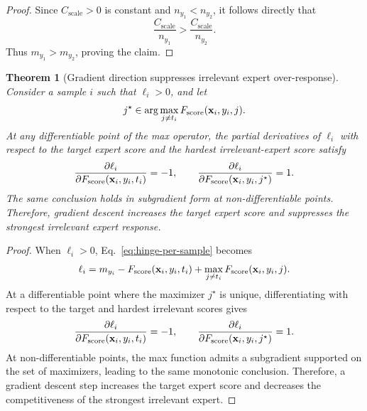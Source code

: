 \documentclass[journal]{IEEEtran}
\theoremstyle{plain}
\newtheorem{theorem}{Theorem}[section]
\theoremstyle{definition}
\theoremstyle{remark}
\begin{document}
\begin{proof}
Since $C_{\mathrm{scale}}>0$ is constant and $n_{y_1}<n_{y_2}$, it follows directly that
\begin{equation}
\frac{C_{\mathrm{scale}}}{n_{y_1}}>\frac{C_{\mathrm{scale}}}{n_{y_2}}.
\end{equation}
Thus $m_{y_1}>m_{y_2}$, proving the claim.
\end{proof}

\begin{theorem}[Gradient direction suppresses irrelevant expert over-response]
\label{thm:gradient-direction}
Consider a sample $i$ such that $\ell_i>0$, and let
\begin{equation}
j^\star\in\arg\max_{j\neq t_i}F_{\mathrm{score}}({\bf x}_i,y_i,j).
\end{equation}
At any differentiable point of the max operator, the partial derivatives of $\ell_i$ with respect to the target expert score and the hardest irrelevant-expert score satisfy
\begin{equation}
\frac{\partial \ell_i}{\partial F_{\mathrm{score}}({\bf x}_i,y_i,t_i)}=-1,
\qquad
\frac{\partial \ell_i}{\partial F_{\mathrm{score}}({\bf x}_i,y_i,j^\star)}=1.
\label{eq:gradient-direction}
\end{equation}
The same conclusion holds in subgradient form at non-differentiable points. Therefore, gradient descent increases the target expert score and suppresses the strongest irrelevant expert response.
\end{theorem}

\begin{proof}
When $\ell_i>0$, Eq.~\eqref{eq:hinge-per-sample} becomes
\begin{equation}
\ell_i
=
m_{y_i}
-
F_{\mathrm{score}}({\bf x}_i,y_i,t_i)
+
\max_{j\neq t_i}F_{\mathrm{score}}({\bf x}_i,y_i,j).
\end{equation}
At a differentiable point where the maximizer $j^\star$ is unique, differentiating with respect to the target and hardest irrelevant scores gives
\begin{equation}
\frac{\partial \ell_i}{\partial F_{\mathrm{score}}({\bf x}_i,y_i,t_i)}=-1,
\qquad
\frac{\partial \ell_i}{\partial F_{\mathrm{score}}({\bf x}_i,y_i,j^\star)}=1.
\end{equation}
At non-differentiable points, the max function admits a subgradient supported on the set of maximizers, leading to the same monotonic conclusion. Therefore, a gradient descent step increases the target expert score and decreases the competitiveness of the strongest irrelevant expert.
\end{proof}
\end{document}
